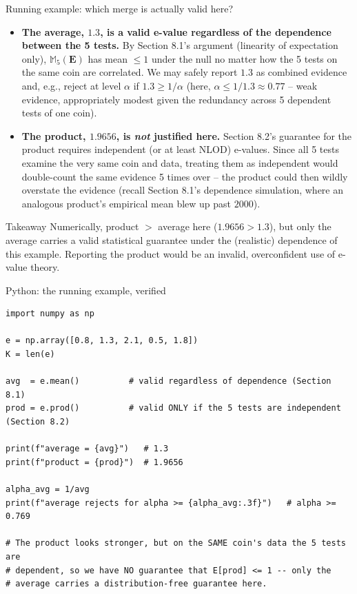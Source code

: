 \documentclass[aspectratio=169,10pt]{beamer}
\begin{document}
\begin{frame}{Running example: which merge is actually valid here?}
  \begin{itemize}
    \item \textbf{The average, $1.3$, is a valid e-value regardless of the dependence between the 5 tests.} By Section 8.1's argument (linearity of expectation only), $\mathbb{M}_5(\mathbf E)$ has mean $\leq 1$ under the null no matter how the 5 tests on the same coin are correlated. We may safely report $1.3$ as combined evidence and, e.g., reject at level $\alpha$ if $1.3 \geq 1/\alpha$ (here, $\alpha \leq 1/1.3 \approx 0.77$ -- weak evidence, appropriately modest given the redundancy across 5 dependent tests of one coin).
    \item \textbf{The product, $1.9656$, is \emph{not} justified here.} Section 8.2's guarantee for the product requires independent (or at least NLOD) e-values. Since all 5 tests examine the very same coin and data, treating them as independent would double-count the same evidence 5 times over -- the product could then wildly overstate the evidence (recall Section 8.1's dependence simulation, where an analogous product's empirical mean blew up past $2000$).
  \end{itemize}
  \begin{block}{Takeaway}
    Numerically, product $>$ average here ($1.9656 > 1.3$), but only the average carries a valid statistical guarantee under the (realistic) dependence of this example. Reporting the product would be an invalid, overconfident use of e-value theory.
  \end{block}
\end{frame}

\begin{frame}[fragile]{Python: the running example, verified}
  \begin{lstlisting}
import numpy as np

e = np.array([0.8, 1.3, 2.1, 0.5, 1.8])
K = len(e)

avg  = e.mean()          # valid regardless of dependence (Section 8.1)
prod = e.prod()          # valid ONLY if the 5 tests are independent (Section 8.2)

print(f"average = {avg}")   # 1.3
print(f"product = {prod}")  # 1.9656

alpha_avg = 1/avg
print(f"average rejects for alpha >= {alpha_avg:.3f}")   # alpha >= 0.769

# The product looks stronger, but on the SAME coin's data the 5 tests are
# dependent, so we have NO guarantee that E[prod] <= 1 -- only the
# average carries a distribution-free guarantee here.
  \end{lstlisting}
\end{frame}
\end{document}

